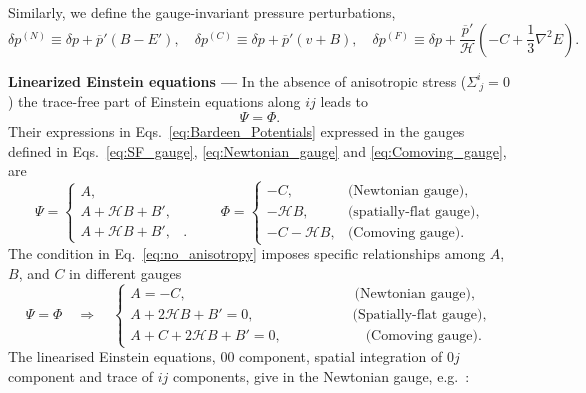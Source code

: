 \documentclass[twocolumn,superscriptaddress,aps,preprintnumbers,amsmath,amssymb,prl,footinbib]{revtex4-2}
\begin{document}
Similarly, we define the gauge-invariant pressure perturbations,
\begin{equation}
    \delta p^{(N)} \equiv \delta p + \overline{p}'(B - E'),\quad \delta p^{(C)}\equiv \delta p  + \overline{p}'(v+B) ,\quad \delta p^{(F)} \equiv \delta p+\frac{\overline{p}'}{\mathcal{H}}\left( -C+\frac{1}{3}\nabla^2E\right).
\end{equation}

\textbf{Linearized Einstein equations ---}
In the absence of anisotropic stress ($\Sigma^i_{\ j}=0$) the trace-free part of Einstein equations along $ij$ leads to
\begin{equation}
\label{eq:no_anisotropy}
    \Psi = \Phi.
\end{equation}
Their expressions in Eqs.~\eqref{eq:Bardeen_Potentials} expressed in the gauges defined in Eqs.~\eqref{eq:SF_gauge}, \eqref{eq:Newtonian_gauge} and \eqref{eq:Comoving_gauge}, are
\begin{equation}
\label{eq:Psi_Phi_different_gauges}
    \Psi =
    \begin{cases}
        A, & \\
        A + \mathcal{H}B + B', &  \\
        A + \mathcal{H}B + B', & .
    \end{cases}\qquad  \Phi =
    \begin{cases}
        -C, & \text{(Newtonian gauge)}, \\
        -\mathcal{H}B, & \text{(spatially-flat gauge)}, \\
        -C - \mathcal{H}B, & \text{(Comoving gauge)}.
    \end{cases}
\end{equation}
The condition in Eq.~\eqref{eq:no_anisotropy} imposes specific relationships among $A$, $B$, and $C$ in different gauges
\begin{equation}
\label{eq:Psi_equal_Phi}
    \Psi=\Phi\quad \Rightarrow \quad\begin{cases}
    A=-C,\qquad \qquad \qquad \qquad \qquad\qquad\textrm{(Newtonian gauge)},\\
    A+2\mathcal{H}B+B'=0,\quad \qquad \qquad \qquad\textrm{(Spatially-flat gauge)},\\
  A+C+2\mathcal{H}B+B'=0,\qquad \qquad \qquad \textrm{(Comoving gauge)}.
    \end{cases}
\end{equation}
The linearised Einstein equations, $00$ component, spatial integration of $0j$ component and trace of $ij$ components, give in the Newtonian gauge, e.g.~\cite{Mukhanov:1990me,Baumann:2022mni}:
\end{document}
